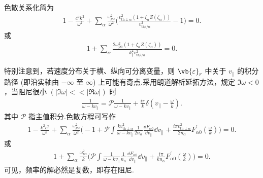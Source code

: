 \begin{exbox}
	色散关系化简为
	\begin{align*}
		1 - \frac{c^2k^2}{\omega^2} + \sum_\alpha\frac{\omega_{p\alpha}^2}{\omega^2}\bigg(\frac{v_{\mathrm{th}\perp\alpha}^2\left(1+\zeta_\alpha Z(\zeta_\alpha)\right)}{v_{\mathrm{th}//\alpha}^2}-1\bigg) = 0.
	\end{align*}
	或
	\begin{align*}
		1 + \sum_\alpha\frac{2\omega_{p\alpha}^2\left(1+\zeta_\alpha Z(\zeta_\alpha)\right)}{k_{\parallel}^2v_{\mathrm{th}//\alpha}^2} = 0.
	\end{align*}

	特别注意到，若速度分布关于横、纵向可分离变量，则 \(\vb{\varepsilon}_r\) 中关于 \(v_{\parallel}\) 的积分路径 (即沿实轴由 \(-\infty\) 至 \(\infty\)) 上可能有奇点.采用朗道解析延拓方法，规定 \(\Im\omega<0\)，当阻尼很小 \(\left(|\Im \omega|<<|\Re\omega|\right)\) 时
	\begin{align*}
		\frac{1}{\omega-k v_{\parallel}} = \mathcal{P}\frac{1}{\omega-k v_{\parallel}} + \frac{i\pi}{k}\delta\left(v_{\parallel}-\frac{\omega}{k}\right).
	\end{align*}
	其中 \(\mathcal{P}\) 指主值积分.色散方程可写作
	\begin{align*}
		1 - \frac{k^2c^2}{\omega^2} + \sum_\alpha\frac{\omega_{p\alpha}^2}{\omega^2}\bigg(-1 + \mathcal{P}\int\frac{k v_{\mathrm{th}\perp\alpha}^2}{\omega-k v_{\parallel}}\frac{1}{2n_\alpha}\frac{\dd F_{\alpha0}}{\dd v_{\parallel}}\dd v_{\parallel} + \frac{i\pi v_{\mathrm{th}\perp\alpha}^2}{2n_\alpha}F_{\alpha0}^\prime\left(\frac{\omega}{k}\right)\bigg) = 0.
	\end{align*}
	或
	\begin{align*}
		1 + \sum_\alpha\frac{\omega_{p\alpha}^2}{k}\bigg(\mathcal{P}\int\frac{1}{\omega-k v_{\parallel}}\frac{1}{n_\alpha}\frac{\dd F_{\alpha0}}{\dd v_{\parallel}}\dd v_{\parallel} + \frac{i\pi}{k n_\alpha}F_{\alpha0}^\prime\left(\frac{\omega}{k}\right)\bigg) = 0.
	\end{align*}
	可见，频率的解必然是复数，即存在阻尼.
\end{exbox}

